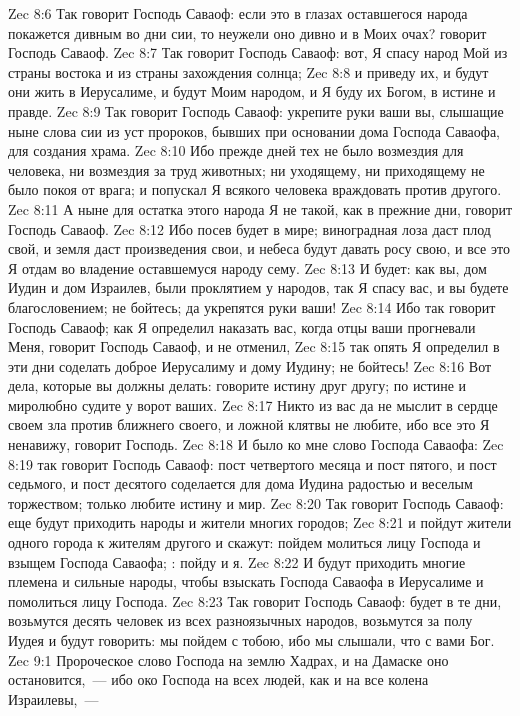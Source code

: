 \vs Zec 8:6 Так говорит Господь Саваоф: если это в глазах оставшегося народа покажется дивным во дни сии, то неужели оно дивно и в Моих очах? говорит Господь Саваоф.
\vs Zec 8:7 Так говорит Господь Саваоф: вот, Я спасу народ Мой из страны востока и из страны захождения солнца;
\vs Zec 8:8 и приведу их, и будут они жить в Иерусалиме, и будут Моим народом, и Я буду их Богом, в истине и правде.
\rsbpar\vs Zec 8:9 Так говорит Господь Саваоф: укрепите руки ваши вы, слышащие ныне слова сии из уст пророков, бывших при основании дома Господа Саваофа, для создания храма.
\vs Zec 8:10 Ибо прежде дней тех не было возмездия для человека, ни возмездия за труд животных; ни уходящему, ни приходящему не было покоя от врага; и попускал Я всякого человека враждовать против другого.
\vs Zec 8:11 А ныне для остатка этого народа Я не такой, как в прежние дни, говорит Господь Саваоф.
\vs Zec 8:12 Ибо посев будет в мире; виноградная лоза даст плод свой, и земля даст произведения свои, и небеса будут давать росу свою, и все это Я отдам во владение оставшемуся народу сему.
\vs Zec 8:13 И будет: как вы, дом Иудин и дом Израилев, были проклятием у народов, так Я спасу вас, и вы будете благословением; не бойтесь; да укрепятся руки ваши!
\vs Zec 8:14 Ибо так говорит Господь Саваоф; как Я определил наказать вас, когда отцы ваши прогневали Меня, говорит Господь Саваоф, и не отменил,
\vs Zec 8:15 так опять Я определил в эти дни соделать доброе Иерусалиму и дому Иудину; не бойтесь!
\vs Zec 8:16 Вот дела, которые вы должны делать: говорите истину друг другу; по истине и миролюбно судите у ворот ваших.
\vs Zec 8:17 Никто из вас да не мыслит в сердце своем зла против ближнего своего, и ложной клятвы не любите, ибо все это Я ненавижу, говорит Господь.
\rsbpar\vs Zec 8:18 И было ко мне слово Господа Саваофа:
\vs Zec 8:19 так говорит Господь Саваоф: пост четвертого месяца и пост пятого, и пост седьмого, и пост десятого соделается для дома Иудина радостью и веселым торжеством; только любите истину и мир.
\vs Zec 8:20 Так говорит Господь Саваоф: еще будут приходить народы и жители многих городов;
\vs Zec 8:21 и пойдут жители одного города к жителям другого и скажут: пойдем молиться лицу Господа и взыщем Господа Саваофа; : пойду и я.
\vs Zec 8:22 И будут приходить многие племена и сильные народы, чтобы взыскать Господа Саваофа в Иерусалиме и помолиться лицу Господа.
\vs Zec 8:23 Так говорит Господь Саваоф: будет в те дни, возьмутся десять человек из всех разноязычных народов, возьмутся за полу Иудея и будут говорить: мы пойдем с тобою, ибо мы слышали, что с вами Бог.
\vs Zec 9:1 Пророческое слово Господа на землю Хадрах, и на Дамаске оно остановится,~--- ибо око Господа на всех людей, как и на все колена Израилевы,~---
